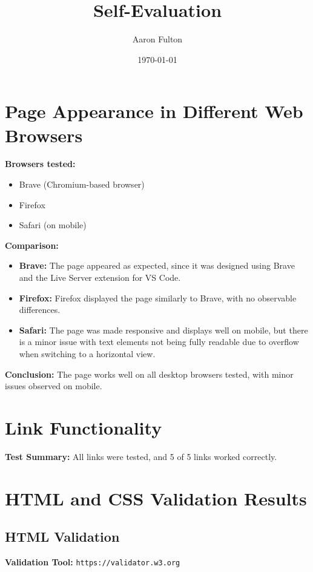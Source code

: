 \documentclass{article}
\title{Self-Evaluation}
\author{Aaron Fulton}
\date{\today}
\begin{document}
\maketitle
\newpage

\section{Page Appearance in Different Web Browsers}

\textbf{Browsers tested:}
\begin{itemize}
    \item Brave (Chromium-based browser)
    \item Firefox
    \item Safari (on mobile) 
\end{itemize}

\textbf{Comparison:}
\begin{itemize}
    \item \textbf{Brave:} The page appeared as expected, since it was designed using Brave and the Live Server extension for VS Code.
    \item \textbf{Firefox:} Firefox displayed the page similarly to Brave, with no observable differences.
    \item \textbf{Safari:} The page was made responsive and displays well on mobile, but there is a minor issue with text 
    elements not being fully readable due to overflow when switching to a horizontal view.
\end{itemize}

\textbf{Conclusion:} The page works well on all desktop browsers tested, with minor issues observed on mobile.

\section{Link Functionality}

\textbf{Test Summary:}
All links were tested, and 5 of 5 links worked correctly.

\section{HTML and CSS Validation Results}

\subsection{HTML Validation}
\textbf{Validation Tool:} \texttt{https://validator.w3.org}
\end{document}
